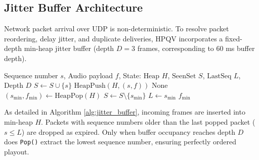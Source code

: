\subsection{Jitter Buffer Architecture}
Network packet arrival over UDP is non-deterministic. To resolve packet reordering, delay jitter, and duplicate deliveries, HPQV incorporates a fixed-depth min-heap jitter buffer (depth $D=3$ frames, corresponding to 60 ms buffer depth).
\begin{algorithm}[htbp]
\caption{HPQV Jitter Buffer Ingestion and Extraction}
\label{alg:jitter_buffer}
\begin{algorithmic}[1]
\Require Sequence number $s$, Audio payload $f$, State: $\text{Heap } H$, $\text{SeenSet } S$, $\text{LastSeq } L$, Depth $D$
        \State \Return {}
    \EndIf
    \State $S \gets S \cup \{s\}$
    \State $\text{HeapPush}(H, (s, f))$
\EndProcedure
{}
        \State \Return $\text{None}$ 
    \EndIf
    \State $(s_{\text{min}}, f_{\text{min}}) \gets \text{HeapPop}(H)$
    \State $S \gets S \setminus \{s_{\text{min}}\}$
    \State $L \gets s_{\text{min}}$
    \State \Return $f_{\text{min}}$
\EndProcedure
\end{algorithmic}
\end{algorithm}
As detailed in Algorithm \ref{alg:jitter_buffer}, incoming frames are inserted into min-heap $H$. Packets with sequence numbers older than the last popped packet ($s \le L$) are dropped as expired. Only when buffer occupancy reaches depth $D$ does \texttt{Pop()} extract the lowest sequence number, ensuring perfectly ordered playout.
